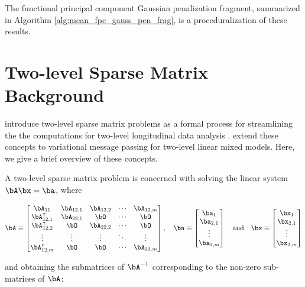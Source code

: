 \documentclass[12pt]{article}
\theoremstyle{plain}
\theoremstyle{definition}
\theoremstyle{remark}
\begin{document}
The functional principal component Gaussian penalization fragment, summarized in Algorithm \ref{alg:mean_fpc_gauss_pen_frag},
is a proceduralization of these results.


\section{Two-level Sparse Matrix Background}
\label{app:two_lev_sparse_mat}

\citet[Section~2]{nolan20} introduce two-level sparse matrix problems as a formal process for streamlining the
the computations for two-level longitudinal data analysis \citep{pinheiro00}. \citet[Section~4]{nolanmw20}
extend these concepts to variational message passing for two-level linear mixed models. Here, we give a brief
overview of these concepts.

A two-level sparse matrix problem is concerned with solving the linear system $\bA \bx = \ba$, where

\begin{equation}
	\bA \equiv \begin{bmatrix}
		\bA_{11} & \bA_{12, 1} & \bA_{12, 2} & \cdots & \bA_{12, m} \\
		\bA^\intercal_{12, 1} & \bA_{22, 1} & \bO & \cdots & \bO \\
		\bA^\intercal_{12, 2} & \bO & \bA_{22, 2} & \cdots & \bO \\
		\vdots & \vdots & \vdots& \ddots & \vdots \\
		\bA^\intercal_{12, m} & \bO & \bO & \cdots & \bA_{22, m}
	\end{bmatrix}, \quad
	\ba \equiv \begin{bmatrix}
		\ba_1 \\
		\ba_{2, 1} \\
		\vdots \\
		\ba_{2, m}
	\end{bmatrix} \quad
	\text{and} \quad
	\bx \equiv \begin{bmatrix}
		\bx_1 \\
		\bx_{2, 1} \\
		\vdots \\
		\bx_{2, m}
	\end{bmatrix}
\label{two_lev_sparse_mat}
\end{equation}

\noindent and obtaining
the submatrices of $\bA^{-1}$ corresponding to the non-zero sub-matrices of $\bA$:
\end{document}
